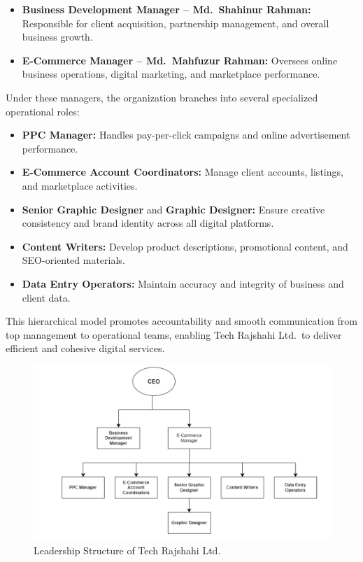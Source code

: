 \documentclass[12pt,a4paper]{article}
\begin{document}
\begin{itemize}
    \item \textbf{Business Development Manager -- Md.\ Shahinur Rahman:} Responsible for client acquisition, partnership management, and overall business growth.
    \item \textbf{E-Commerce Manager -- Md.\ Mahfuzur Rahman:} Oversees online business operations, digital marketing, and marketplace performance.
\end{itemize}

Under these managers, the organization branches into several specialized operational roles:

\begin{itemize}
    \item \textbf{PPC Manager:} Handles pay-per-click campaigns and online advertisement performance.
    \item \textbf{E-Commerce Account Coordinators:} Manage client accounts, listings, and marketplace activities.
    \item \textbf{Senior Graphic Designer} and \textbf{Graphic Designer:} Ensure creative consistency and brand identity across all digital platforms.
    \item \textbf{Content Writers:} Develop product descriptions, promotional content, and SEO-oriented materials.
    \item \textbf{Data Entry Operators:} Maintain accuracy and integrity of business and client data.
\end{itemize}

This hierarchical model promotes accountability and smooth communication from top management to operational teams, enabling Tech Rajshahi Ltd.\ to deliver efficient and cohesive digital services.

\begin{figure}[H]
    \centering
    \includegraphics[width=\textwidth]{Fig/tech_leadership_structure.png}
    \caption{Leadership Structure of Tech Rajshahi Ltd.}
    \label{fig:leadership_structure}
\end{figure}
\end{document}

